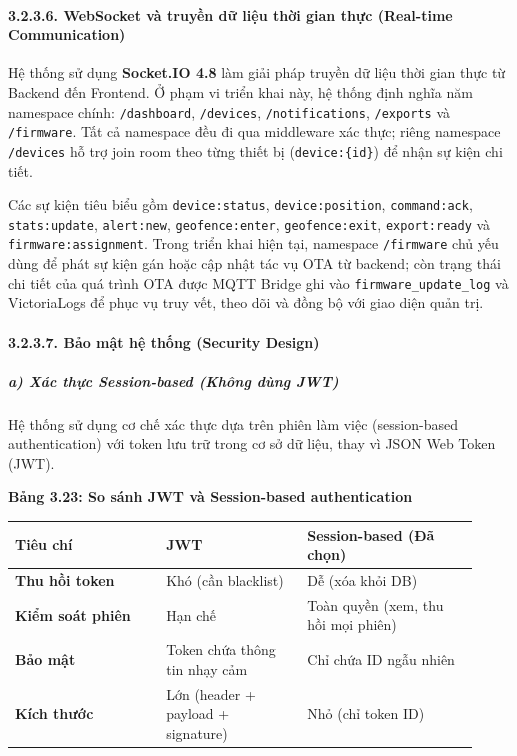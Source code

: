 \documentclass[13pt,a4paper]{extarticle}
\newcounter{none} %
\newcommand{\thesislongtableorignewline}{}
\let\thesislongtableorignewline\\
\renewcommand{\\}{\thesislongtableorignewline\hline}%
\let\\\thesislongtableorignewline
\newcommand{\thesistabletitle}[1]{%
  \begin{center}\textbf{#1}\end{center}%
}
\begin{document}
\paragraph{3.2.3.6. WebSocket và truyền dữ liệu thời gian thực
(Real-time
Communication)}\label{3236-websocket-vuxe0-truyux1ec1n-dux1eef-liux1ec7u-thux1eddi-gian-thux1ef1c-real-time-communication}

Hệ thống sử dụng \textbf{Socket.IO 4.8} làm giải pháp truyền dữ liệu
thời gian thực từ Backend đến Frontend. Ở phạm vi triển khai này, hệ
thống định nghĩa năm namespace chính: \texttt{/dashboard},
\texttt{/devices}, \texttt{/notifications}, \texttt{/exports} và
\texttt{/firmware}. Tất cả namespace đều đi qua middleware xác thực;
riêng namespace \texttt{/devices} hỗ trợ join room theo từng thiết bị
(\texttt{device:\{id\}}) để nhận sự kiện chi tiết.

Các sự kiện tiêu biểu gồm \texttt{device:status},
\texttt{device:position}, \texttt{command:ack}, \texttt{stats:update},
\texttt{alert:new}, \texttt{geofence:enter}, \texttt{geofence:exit},
\texttt{export:ready} và \texttt{firmware:assignment}. Trong triển khai
hiện tại, namespace \texttt{/firmware} chủ yếu dùng để phát sự kiện gán
hoặc cập nhật tác vụ OTA từ backend; còn trạng thái chi tiết của quá
trình OTA được MQTT Bridge ghi vào \texttt{firmware\_update\_log} và
VictoriaLogs để phục vụ truy vết, theo dõi và đồng bộ với giao diện quản
trị.

\paragraph{3.2.3.7. Bảo mật hệ thống (Security
Design)}\label{3237-bux1ea3o-mux1eadt-hux1ec7-thux1ed1ng-security-design}

\subparagraph{a) Xác thực Session-based (Không dùng
JWT)}\label{a-xuxe1c-thux1ef1c-session-based-khuxf4ng-duxf9ng-jwt}

Hệ thống sử dụng cơ chế xác thực dựa trên phiên làm việc (session-based
authentication) với token lưu trữ trong cơ sở dữ liệu, thay vì JSON Web
Token (JWT).

\thesistabletitle{Bảng 3.23: So sánh JWT và Session-based authentication}

{\def\LTcaptype{none} %
\begin{longtable}{|p{0.30\linewidth}|p{0.28\linewidth}|p{0.34\linewidth}|}
\hline \textbf{Tiêu chí} & \textbf{JWT} & \textbf{Session-based (Đã chọn)} \\
\hline
\endhead
\hline
\endlastfoot
\textbf{Thu hồi token} & Khó (cần blacklist) & Dễ (xóa khỏi DB) \\
\textbf{Kiểm soát phiên} & Hạn chế & Toàn quyền (xem, thu hồi mọi
phiên) \\
\textbf{Bảo mật} & Token chứa thông tin nhạy cảm & Chỉ chứa ID ngẫu
nhiên \\
\textbf{Kích thước} & Lớn (header + payload + signature) & Nhỏ (chỉ
token ID) \\
\end{longtable}
}
\end{document}
